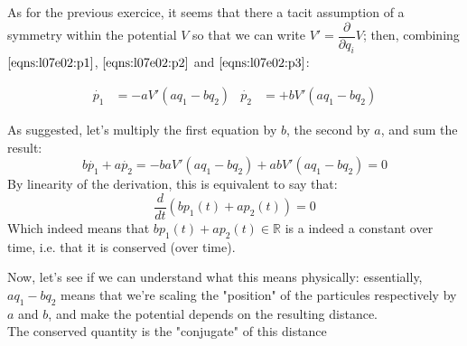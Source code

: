 \documentclass[solutions.tex]{subfiles}
\begin{document}
As for the previous exercice, it seems that there a tacit assumption
of a symmetry within the potential $V$ so that we can write
$V' = \dfrac{\partial}{\partial q_i}V$; then, combining $\eqref{eqns:l07e02:p1}$,
$\eqref{eqns:l07e02:p2}$ and $\eqref{eqns:l07e02:p3}$:

\begin{align*}
	\dot{p_1} &= -aV'(a q_1 - b q_2) &
	\dot{p_2} &= +bV'(a q_1 - b q_2)
\end{align*}

As suggested, let's multiply the first equation by $b$, the second by $a$,
and sum the result:
\[
	b\dot{p_1} + a\dot{p_2} = -baV'(a q_1 - b q_2) +abV'(a q_1 - b q_2) = 0
\]
By linearity of the derivation, this is equivalent to say that:
\[
	\frac{d}{dt}(b p_1(t) + a p_2(t)) = 0
\]
Which indeed means that $b p_1(t) + a p_2(t) \in \mathbb{R}$ is a indeed
a constant over time, i.e. that it is conserved (over time).

\hrr

Now, let's see if we can understand what this means physically: essentially,
$a q_1 - b q_2$ means that we're scaling the "position" of the particules
respectively by $a$ and $b$, and make the potential depends on the resulting
distance. \\

The conserved quantity is the "conjugate" of this distance
\end{document}
